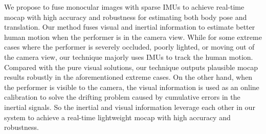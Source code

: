 %
%
\par
We propose to fuse monocular images with sparse IMUs to achieve real-time mocap with high accuracy and robustness for estimating both body pose and translation.
%
Our method fuses visual and inertial information to estimate better human motion when the performer is in the camera view.
%
While for some extreme cases where the performer is severely occluded, poorly lighted, or moving out of the camera view, our technique majorly uses IMUs to track the human motion.
%
Compared with the pure visual solutions, our technique outputs plausible mocap results robustly in the aforementioned extreme cases. %
%
On the other hand, when the performer is visible to the camera, the visual information is used as an online calibration to solve the drifting problem caused by cumulative errors in the inertial signals.
%
So the inertial and visual information leverage each other in our system to achieve a real-time lightweight mocap with high accuracy and robustness.
%
%
%
%
\par

